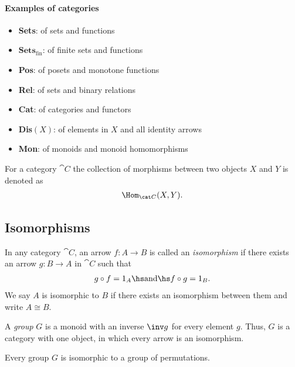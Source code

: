 \documentclass{article}
\begin{document}
\paragraph{Examples of categories}
\begin{itemize}
    \item \textbf{Sets}: of sets and functions
    \item $\textbf{Sets}_\text{fin}$: of finite sets and functions
    \item \textbf{Pos}: of posets and monotone functions
    \item \textbf{Rel}: of sets and binary relations
    \item \textbf{Cat}: of categories and functors
    \item \textbf{Dis$(X)$}: of elements in $X$ and all identity arrows
    \item \textbf{Mon}: of monoids and monoid homomorphisms
\end{itemize}

\begin{definition}
    For a category $\cat C$ the collection of morphisms between two objects
    $X$ and $Y$ is denoted as
    \begin{align*}
        \Hom_{\cat C}(X,Y).
    \end{align*}
\end{definition}

\subsection{Isomorphisms}

\begin{definition}
    In any category $\cat{C}$, an arrow $f:A\to B$ is called an
    \emph{isomorphism} if there exists an arrow $g:B\to A$ in
    $\cat{C}$ such that 
    \begin{align*}
        g\circ f = 1_A\hs\text{and}\hs f\circ g = 1_B.
    \end{align*}
    We say $A$ is isomorphic to $B$ if there exists an isomorphism
    between them and write $A\cong B$.
\end{definition}

\begin{definition}
    A \emph{group} $G$ is a monoid with an inverse $\inv g$ for every element $g$.
    Thus, $G$ is a category with one object, in which every arrow is an isomorphism.
\end{definition}

\begin{theorem}[Cayley]
    Every group $G$ is isomorphic to a group of permutations.
\end{theorem}
\end{document}
